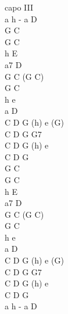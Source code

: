 \begin{chord}
capo III\\
a h - a D\\
G C\\
G C\\
h E\\
a7 D\\

G C (G C)\\
G C\\
h e\\
a D\\

C D G (h) e (G)\\
C D G G7\\
C D G (h) e\\
C D G\\

G C\\
G C\\
h E\\
a7 D\\

G C (G C)\\
G C\\
h e\\
a D\\

C D G (h) e (G)\\
C D G G7\\
C D G (h) e\\
C D G\\
a h - a D\\
\end{chord}





